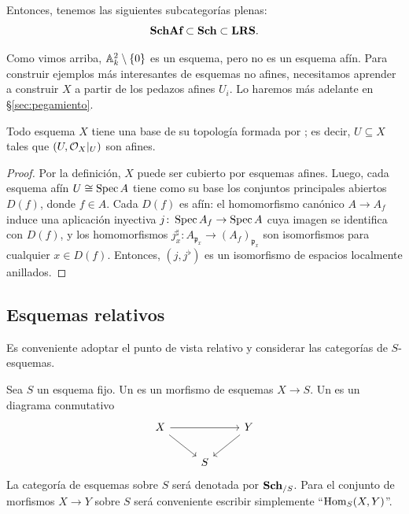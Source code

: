 \documentclass{article}
\numberwithin{equation}{section}
\theoremstyle{definition}
\begin{document}
Entonces, tenemos las siguientes subcategorías plenas:
$$\categ{SchAf} \subset \categ{Sch} \subset \categ{LRS}.$$

Como vimos arriba, $\AA^2_k \setminus \{ 0 \}$ es un esquema, pero no es
un esquema afín. Para construir ejemplos más interesantes de esquemas no afines,
necesitamos aprender a construir $X$ a partir de los pedazos afines $U_i$.
Lo haremos más adelante en \S\ref{sec:pegamiento}.

\begin{proposicion}
  Todo esquema $X$ tiene una base de su topología formada por
  ; es decir, $U \subseteq X$ tales que
  $(U, \O_X|_U)$ son afines.

  \begin{proof}
    Por la definición, $X$ puede ser cubierto por esquemas afines. Luego, cada
    esquema afín $U \isom \Spec A$ tiene como su base los conjuntos principales
    abiertos $D (f)$, donde $f \in A$. Cada $D (f)$ es afín: el homomorfismo
    canónico $A \to A_f$ induce una aplicación inyectiva
    $j\colon \Spec A_f \to \Spec A$ cuya imagen se identifica con $D (f)$,
    y los homomorfismos
    $j_x^\sharp\colon A_{\mathfrak{p}_x} \to (A_f)_{\mathfrak{p}_x}$ son
    isomorfismos para cualquier $x \in D (f)$. Entonces, $(j,j^\flat)$
    es un isomorfismo de espacios localmente anillados.
  \end{proof}
\end{proposicion}

\subsection{Esquemas relativos}
\label{sec:esquemas-relativos}

Es conveniente adoptar el punto de vista relativo y considerar las categorías
de $S$-esquemas.

\begin{definicion}
  \label{dfn:esquemas-sobre-s}
  Sea $S$ un esquema fijo. Un  es un morfismo
  de esquemas $X \to S$. Un  es un diagrama
  conmutativo
  \[ \begin{tikzcd}
      X\ar{rr}\ar{dr} && Y\ar{dl} \\
      & S
    \end{tikzcd} \]
  La categoría de esquemas sobre $S$ será denotada por $\categ{Sch}_{/S}$.
  Para el conjunto de morfismos $X\to Y$ sobre $S$ será conveniente escribir
  simplemente ``$\Hom_S (X,Y)$''.
\end{definicion}
\end{document}
